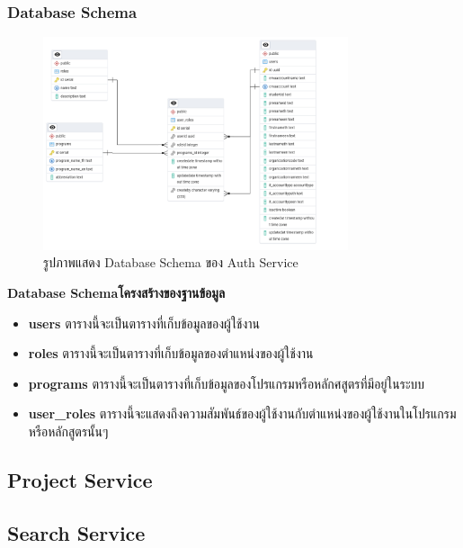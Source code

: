 \subsubsection{Database Schema}
\begin{figure}[H]
  \centering
  \includegraphics[width=0.8\textwidth]{pictures/auth_db.png}
  \caption{รูปภาพแสดง Database Schema ของ Auth Service}
  \label{fig:auth_service}
\end{figure}
\textbf{\ifenglish Database Schema\else โครงสร้างของฐานข้อมูล\fi}
\begin{itemize}
  \item \textbf{users} ตารางนี้จะเป็นตารางที่เก็บข้อมูลของผู้ใช้งาน 
  \item \textbf{roles} ตารางนี้จะเป็นตารางที่เก็บข้อมูลของตำแหน่งของผู้ใช้งาน
  \item \textbf{programs} ตารางนี้จะเป็นตารางที่เก็บข้อมูลของโปรแกรมหรือหลักศสูตรที่มีอยู่ในระบบ
  \item \textbf{user\_roles} ตารางนี้จะแสดงถึงความสัมพันธ์ของผู้ใช้งานกับตำแหน่งของผู้ใช้งานในโปรแกรมหรือหลักสูตรนั้นๆ
\end{itemize}
\subsection{Project Service}
\subsection{Search Service}

